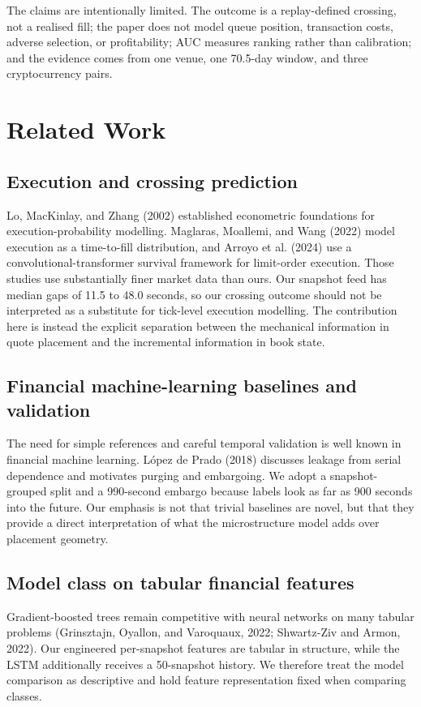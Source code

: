 \documentclass[11pt]{article}
\begin{document}
The claims are intentionally limited. The outcome is a replay-defined crossing, not a realised fill; the paper does not model queue position, transaction costs, adverse selection, or profitability; AUC measures ranking rather than calibration; and the evidence comes from one venue, one 70.5-day window, and three cryptocurrency pairs.

\section{Related Work}
\subsection{Execution and crossing prediction}
Lo, MacKinlay, and Zhang (2002) established econometric foundations for execution-probability modelling. Maglaras, Moallemi, and Wang (2022) model execution as a time-to-fill distribution, and Arroyo et al. (2024) use a convolutional-transformer survival framework for limit-order execution. Those studies use substantially finer market data than ours. Our snapshot feed has median gaps of 11.5 to 48.0 seconds, so our crossing outcome should not be interpreted as a substitute for tick-level execution modelling. The contribution here is instead the explicit separation between the mechanical information in quote placement and the incremental information in book state.

\subsection{Financial machine-learning baselines and validation}
The need for simple references and careful temporal validation is well known in financial machine learning. López de Prado (2018) discusses leakage from serial dependence and motivates purging and embargoing. We adopt a snapshot-grouped split and a 990-second embargo because labels look as far as 900 seconds into the future. Our emphasis is not that trivial baselines are novel, but that they provide a direct interpretation of what the microstructure model adds over placement geometry.

\subsection{Model class on tabular financial features}
Gradient-boosted trees remain competitive with neural networks on many tabular problems (Grinsztajn, Oyallon, and Varoquaux, 2022; Shwartz-Ziv and Armon, 2022). Our engineered per-snapshot features are tabular in structure, while the LSTM additionally receives a 50-snapshot history. We therefore treat the model comparison as descriptive and hold feature representation fixed when comparing classes.
\end{document}
